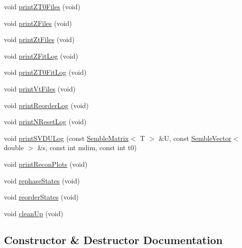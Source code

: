 \begin{DoxyCompactItemize}
\item 
void \mbox{\hyperlink{structSEMBLE_1_1SMT0Fit_a503743e09b5c5f01d6b568dbd5d1ab5a}{print\+Z\+T0\+Files}} (void)
\item 
void \mbox{\hyperlink{structSEMBLE_1_1SMT0Fit_ad9381bac6df9a9ba07f13dac7316b56a}{print\+Z\+Files}} (void)
\item 
void \mbox{\hyperlink{structSEMBLE_1_1SMT0Fit_ab63a7af0133bf01ef5780d4030eac5c7}{print\+Zt\+Files}} (void)
\item 
void \mbox{\hyperlink{structSEMBLE_1_1SMT0Fit_ac05aeb4146f537a4e956de7ed302a056}{print\+Z\+Fit\+Log}} (void)
\item 
void \mbox{\hyperlink{structSEMBLE_1_1SMT0Fit_af8e7b3bd0f80d0f4eda9c02d0aa89912}{print\+Z\+T0\+Fit\+Log}} (void)
\item 
void \mbox{\hyperlink{structSEMBLE_1_1SMT0Fit_a20e4a3b9231871541c881902ff0da2a3}{print\+Vt\+Files}} (void)
\item 
void \mbox{\hyperlink{structSEMBLE_1_1SMT0Fit_aa25369b9c7a77b7be15294eabd75427d}{print\+Reorder\+Log}} (void)
\item 
void \mbox{\hyperlink{structSEMBLE_1_1SMT0Fit_a45f5b6b87ab4828a73de4150eec496b1}{print\+N\+Reset\+Log}} (void)
\item 
void \mbox{\hyperlink{structSEMBLE_1_1SMT0Fit_a054737215697a880fe9feedacb6ffb61}{print\+S\+V\+D\+U\+Log}} (const \mbox{\hyperlink{structSEMBLE_1_1SembleMatrix}{Semble\+Matrix}}$<$ T $>$ \&U, const \mbox{\hyperlink{structSEMBLE_1_1SembleVector}{Semble\+Vector}}$<$ double $>$ \&s, const int mdim, const int t0)
\item 
void \mbox{\hyperlink{structSEMBLE_1_1SMT0Fit_af22140ceb91751e0397e099be80e4e26}{print\+Recon\+Plots}} (void)
\item 
void \mbox{\hyperlink{structSEMBLE_1_1SMT0Fit_ae6cc499f68d4bdb3b9c355fcde7905f7}{rephase\+States}} (void)
\item 
void \mbox{\hyperlink{structSEMBLE_1_1SMT0Fit_a173df18017871b3d27ae10eb16422224}{reorder\+States}} (void)
\item 
void \mbox{\hyperlink{structSEMBLE_1_1SMT0Fit_af7fdbb36395ef2aa852a7735405b3421}{clean\+Up}} (void)
\end{DoxyCompactItemize}


\subsection{Constructor \& Destructor Documentation}
\mbox{\label{structSEMBLE_1_1SMT0Fit_a7fe742a611df3fc26dfde896488115e8}} 

